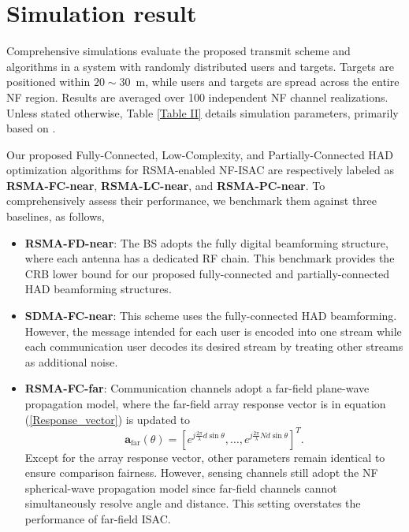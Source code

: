 \documentclass[10pt,journal,twocolumn]{IEEEtran}
\begin{document}
\section{Simulation result}\label{Section V}


Comprehensive simulations evaluate the proposed transmit scheme and algorithms in a system with randomly distributed users and targets. Targets are positioned within $20\sim 30$~m, while users and targets are spread across the entire NF region. Results are averaged over 100 independent NF channel realizations. Unless stated otherwise, Table \ref{Table II} details simulation parameters, primarily based on \cite{10579914,10520715}.

Our proposed Fully-Connected, Low-Complexity, and Partially-Connected HAD optimization algorithms for RSMA-enabled NF-ISAC are respectively labeled as {\bf{RSMA-FC-near}}, {\bf{RSMA-LC-near}}, and  {\bf{RSMA-PC-near}}. To comprehensively assess their performance, we benchmark them against three baselines, as follows,
\begin{itemize}
\item {\bf{RSMA-FD-near}}: The BS adopts the fully digital beamforming structure, where each antenna has a dedicated RF chain. This benchmark provides the CRB lower bound for our proposed fully-connected and partially-connected HAD beamforming structures.
\item {\bf{SDMA-FC-near}}: This scheme uses the fully-connected HAD beamforming. However, the message intended for each user is encoded into one stream while each communication user decodes its desired stream by treating other streams as additional noise.
\item {\bf{RSMA-FC-far}}:  Communication channels adopt a far-field plane-wave propagation model, where the far-field array response vector is in equation (\ref{Response_vector}) is updated to
\begin{equation}
\mathbf{a}_{\text{far}}\left(\theta\right)= \left[e^{j\frac{2\pi}{\lambda}d\sin\theta},\dots,e^{j\frac{2\pi}{\lambda}Nd\sin\theta}\right]^T.
\label{Far-Channel}
\end{equation}
Except for the array response vector, other parameters remain identical to ensure comparison fairness. However, sensing channels still adopt the NF spherical-wave propagation model since far-field channels cannot simultaneously resolve angle and distance. This setting overstates the performance of far-field ISAC.
\end{itemize}
\end{document}
